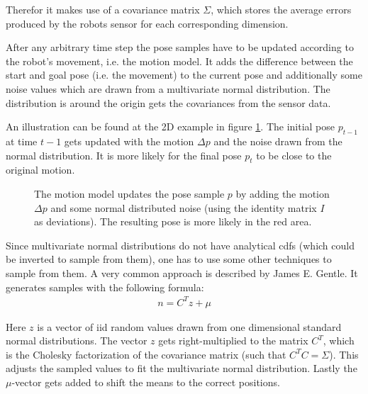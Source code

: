 \documentclass[Thesis.tex]{subfiles}
\begin{document}
Therefor it makes use of a covariance matrix $\Sigma$, which stores the average errors produced by the robots sensor for each corresponding dimension.


After any arbitrary time step the pose samples have to be updated according to the robot's movement, i.e. the motion model. It adds the difference between the start and goal pose (i.e. the movement) to the current pose and additionally some noise values which are drawn from a multivariate normal distribution. The distribution is around the origin gets the covariances from the sensor data. 

An illustration can be found at the 2D example in figure \ref{fig:2d_noise_sampling}. The initial pose $p_{t-1}$ at time $t-1$ gets updated with the motion $\Delta p$ and the noise drawn from the normal distribution. It is more likely for the final pose $p_t$ to be close to the original motion.
\begin{figure}
  \caption{The motion model updates the pose sample $p$ by adding the motion $\Delta p$ and some normal distributed noise (using the identity matrix $I$ as deviations). The resulting pose is more likely in the red area.}
  \label{fig:2d_noise_sampling}
\end{figure}

Since multivariate normal distributions do not have analytical \gls{cdf}s (which could be inverted to sample from them), one has to use some other techniques to sample from them. A very common approach is described by James E. Gentle\cite[p.~197]{Gentle:2005}. It generates samples with the following formula:
%
\begin{align}
n = C^T z + \mu
\end{align}

Here $z$ is a vector of \gls{iid} random values drawn from one dimensional standard normal distributions. The vector $z$ gets right-multiplied to the matrix $C^T$, which is the Cholesky factorization of the covariance matrix (such that $C^TC = \Sigma$). This adjusts the sampled values to fit the multivariate normal distribution. Lastly the $\mu$-vector gets added to shift the means to the correct positions.
\end{document}
